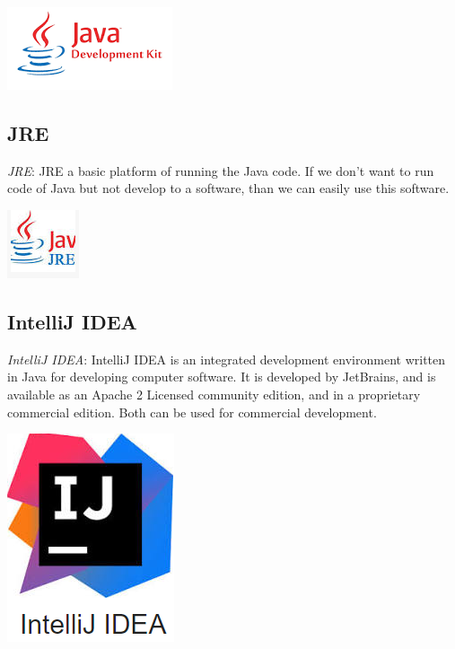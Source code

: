 \documentclass[paper = A5, headinclude, parskip = full, oneside, font = 11 pt]{report}
\begin{document}
\begin{center}
 \includegraphics[width = 140 pt]{JDK.png}
\end{center}

\color{red}
\subsection{JRE}
\color{black}
\textit{JRE}: JRE a basic platform of running the Java code. If we don't want to run code of Java but not develop to a software, than we can easily use this software.

\begin{center}
 \includegraphics[width = 140 pt]{JRE.png}
\end{center}

\color{red}
\subsection{IntelliJ IDEA}
\color{black}
\textit{IntelliJ IDEA}: IntelliJ IDEA is an integrated development environment written in Java for developing computer software. It is developed by JetBrains, and is available as an Apache 2 Licensed community edition, and in a proprietary commercial edition. Both can be used for commercial development.

\begin{center}
 \includegraphics[width = 140 pt]{IntelliJ IDEA.png}
\end{center}
\end{document}
